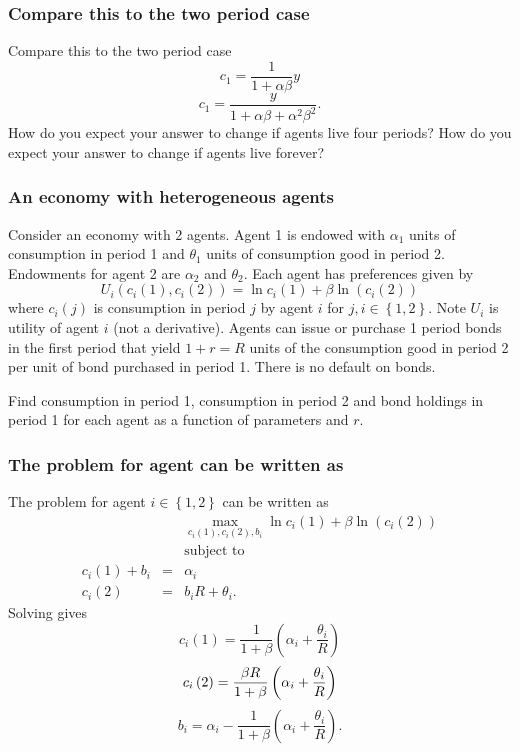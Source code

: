 \documentclass[aspectratio=169]{ltx-talk}
\begin{document}
\begin{frame}
\frametitle{Compare this to the two period case}
Compare this to the two period case%
\begin{equation*}
c_{1}=\frac{1}{1+\alpha \beta }y
\end{equation*}%
\begin{equation*}
c_{1}=\frac{y}{1+\alpha \beta +\alpha ^{2}\beta ^{2}}.
\end{equation*}%
How do you expect your answer to change if agents live four periods?
How do you expect your answer to change if agents live forever?
\end{frame}

\begin{frame}
\frametitle{An economy with heterogeneous agents}
Consider an economy with 2 agents. Agent 1 is endowed with $\alpha _{1}$
units of consumption in period 1 and $\theta _{1}$ units of consumption good
in period 2. Endowments for agent 2 are $\alpha _{2}$ and $\theta _{2}.$
Each agent has preferences given by 
\begin{equation*}
U_{i}\left( c_{i}\left( 1\right) ,c_{i}\left( 2\right) \right) =\ln
c_{i}\left( 1\right) +\beta \ln \left( c_{i}\left( 2\right) \right)
\end{equation*}%
where $c_{i}\left( j\right) $ is consumption in period $j$ by agent $i$ for $%
j,i\in \left\{ 1,2\right\} .$ Note $U_{i}$ is utility of agent $i$ (not a
derivative). Agents can issue or purchase 1 period bonds in the first period
that yield $1+r=R$ units of the consumption good in period 2 per unit of
bond purchased in period 1. There is no default on bonds.

Find consumption in period 1, consumption in period 2 and bond holdings in
period 1 for each agent as a function of parameters and $r.$\newline
\end{frame}

\begin{frame}
\frametitle{The problem for agent can be written as}
The problem for agent $i\in \left\{ 1,2\right\} $ can be written as%
\begin{eqnarray*}
&&\underset{c_{i}\left( 1\right) ,c_{i}\left( 2\right) ,b_{i}}{\max }\ln
c_{i}\left( 1\right) +\beta \ln \left( c_{i}\left( 2\right) \right) \\
&&\text{subject to} \\
c_{i}\left( 1\right) +b_{i} &=&\alpha _{i} \\
c_{i}\left( 2\right) &=&b_{i}R+\theta _{i}.
\end{eqnarray*}%
Solving gives 
\begin{equation*}
c_{i}\left( 1\right) =\frac{1}{1+\beta }\left( \alpha _{i}+\frac{\theta _{i}%
}{R}\right)
\end{equation*}%
\begin{equation*}
c_{i}\left( 2\right) =\frac{\beta R}{1+\beta }\left( \alpha _{i}+\frac{%
\theta _{i}}{R}\right)
\end{equation*}%
\begin{equation}
b_{i}=\alpha _{i}-\frac{1}{1+\beta }\left( \alpha _{i}+\frac{\theta _{i}}{R}%
\right) .  \label{bond}
\end{equation}
\end{frame}
\end{document}
